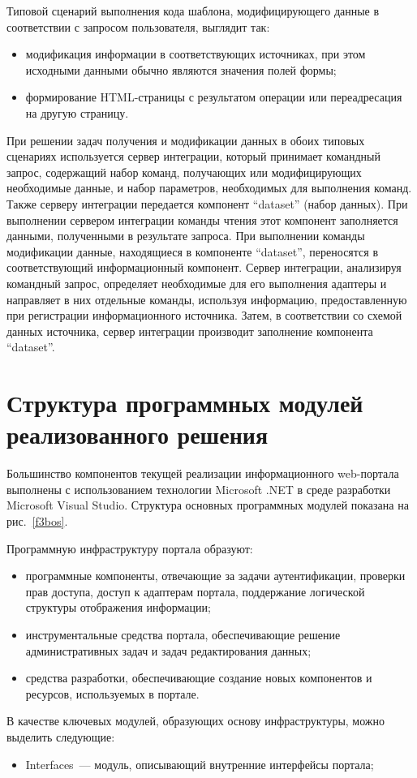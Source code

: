 \begin{multicols}{2}
 Типовой сценарий выполнения кода шаблона, модифицирующего данные в
соответствии с запросом пользователя, выглядит так:
 \begin{itemize}
\item модификация информации в соответствующих источниках, при этом
исходными данными обычно являются значения полей формы;
\item формирование HTML-страницы с результатом операции или переадресация
на другую стра\-ницу.
\end{itemize}

 При решении задач получения и модификации данных в обоих типовых сценариях
используется сервер интеграции, который принимает командный запрос,
содержащий набор команд, по\-лу\-ча\-ющих или модифицирующих необходимые данные,
и набор параметров, необходимых для выпол\-не\-ния команд. Также серверу
интеграции передается компонент ``dataset'' (набор данных). При выполнении
сервером интеграции команды чтения этот компонент заполняется данными,
полученными в результате запроса. При выполнении команды модификации данные,
находящиеся в компоненте ``dataset'', переносятся в соответствующий
информационный компонент. Сервер интеграции, анализируя командный запрос,
определяет необходимые для его выполнения адаптеры и направляет в них
отдельные команды, используя информацию, предо\-став\-лен\-ную при
регистрации информационного источника. Затем, в соответствии со схемой данных
источника, сервер интеграции производит заполнение компонента ``dataset''.

\section{Структура программных модулей реализованного
решения} %

 Большинство компонентов текущей реализации информационного web-портала
выполнены с использованием технологии Microsoft .NET в среде разработки
Microsoft Visual Studio. Структура основных программных модулей показана
на рис.~\ref{f3bos}.

 Программную инфраструктуру портала обра\-зуют:
 \begin{itemize}
\item программные компоненты, отвечающие за задачи аутентификации, проверки
прав доступа, доступ к адаптерам портала, поддержание логической структуры
отображения информации;
\item инструментальные средства портала, обеспечивающие решение
административных задач и задач редактирования данных;
\item средства разработки, обеспечивающие создание новых компонентов и
ресурсов, используемых в портале.
\end{itemize}

 В качестве ключевых модулей, образующих основу инфраструктуры, можно
выделить следующие:
 \begin{itemize}
\item Interfaces~--- модуль, описывающий внутренние интерфейсы портала;
\end{itemize}

\pagebreak
\end{multicols}


